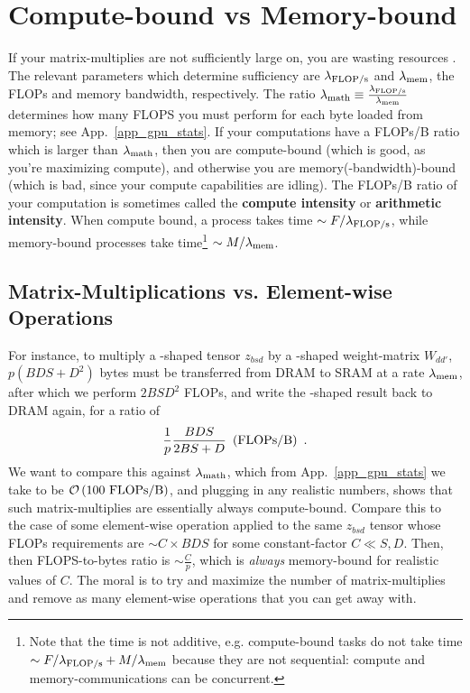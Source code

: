 \section{Compute-bound vs Memory-bound \label{app_compute_mem_bound} }

If your matrix-multiplies are not sufficiently large on, you are wasting resources
\cite{he2022brrrrfromfirstprinciples}. The relevant parameters which determine sufficiency are $
	\lambda _{ {\rm FLOP/s}  } $ and $ \lambda _{ {\rm mem}  } $, the FLOPs and memory bandwidth,
respectively. The ratio $  \lambda _{ {\rm math}  } \equiv \frac{  \lambda _{ {\rm FLOP/s}  } }{
		\lambda _{ {\rm mem}  } }   $ determines how many FLOPS you must perform for each byte loaded from
memory; see App.~\ref{app_gpu_stats}. If your computations have a FLOPs/B ratio which is larger than
$ \lambda _{ {\rm math}  } $, then you are compute-bound (which is good, as you're maximizing
compute), and otherwise you are memory(-bandwidth)-bound (which is bad, since your compute
capabilities are idling). The FLOPs/B ratio of your computation is sometimes called the
\textbf{compute intensity} or \textbf{arithmetic intensity}. When compute bound, a process takes
time $ \sim F/\lambda _{ {\rm FLOP/s} } $, while memory-bound processes take time\footnote{Note that
	the time is not additive, e.g. compute-bound tasks do not take time $ \sim F/\lambda _{ {\rm FLOP/s}
		} +M/\lambda _{ {\rm mem} }$ because they are not sequential: compute and memory-communications can
	be concurrent.} $ \sim M/\lambda _{ {\rm mem} } $.



\subsection{Matrix-Multiplications vs. Element-wise Operations}

For instance, to multiply a -shaped tensor $ z _{ bsd } $ by a -shaped
weight-matrix $ W _{ d d' } $, $ p \left ( BDS +D ^{ 2 } \right ) $ bytes must be transferred from
DRAM to SRAM at a rate $ \lambda _{ {\rm  mem}  } $, after which we perform $ 2BSD ^{ 2 } $ FLOPs,
and write the -shaped  result back to DRAM again, for a ratio of
\begin{align}
	\frac{ 1 }{ p } \frac{ BDS }{ 2BS + D } \ \left ( {\rm FLOPs/B} \right )  \ .
\end{align}
We want to compare this against $ \lambda _{ {\rm math}  } $, which from
App.~\ref{app_gpu_stats} we take to be $ \mathcal{O} \left( 100\  {\rm FLOPs/B} \right)  $, and plugging
in any realistic numbers, shows that such matrix-multiplies are essentially always compute-bound.
Compare this to the case of some element-wise operation applied to the same $ z _{ bsd } $ tensor
whose FLOPs requirements are $ \sim C\times BDS $ for some constant-factor $ C \ll S, D $.  Then,
then FLOPS-to-bytes ratio is $ \sim \frac{ C }{ p } $, which is \textit{always} memory-bound for
realistic values of $ C $. The moral is to try and maximize the number of matrix-multiplies and
remove as many element-wise operations that you can get away with.


